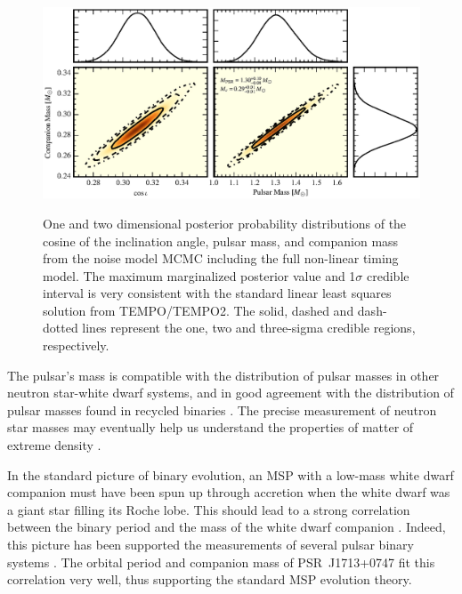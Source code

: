 \begin{figure}[!ht]
\centering
\includegraphics[scale=1]{1713_masses_color.eps} \\ 
\caption {\label{fig:masses}  One and two dimensional posterior probability
distributions of the cosine of the inclination
angle, pulsar mass, and companion mass from the noise model MCMC including the full non-linear timing model. The maximum marginalized posterior
value and 1$\sigma$ credible interval is very consistent with the standard linear least
squares solution from \textsc{TEMPO}/\textsc{TEMPO2}. The solid, dashed and dash-dotted lines represent the one, two and three-sigma credible regions, respectively.
} 
\end{figure} 


The pulsar's mass is compatible with the distribution of pulsar masses
in other neutron star-white dwarf systems, and in good
agreement with the distribution of pulsar masses found in recycled binaries
\citep{opns12,kkdt13}. The precise measurement of neutron star masses 
may eventually help us understand the properties of matter of extreme 
density \citep{dpr+10, lat12, afw+13}.

In the standard picture of binary evolution, an MSP with a low-mass white dwarf companion must have been spun up through accretion when the white dwarf was a giant star filling its Roche lobe. 
This should lead to a strong correlation between the binary period and the mass of the white dwarf companion \citep{rpj+95, ts99a, prp02b}. 
Indeed, this picture has been supported the measurements of several pulsar
binary systems \citep[e.g.][]{vbb+01, ktr94, th14, rsa+14}.  
The orbital period and companion mass of PSR~J1713+0747 fit
this correlation very well, thus supporting the standard MSP evolution theory. 


